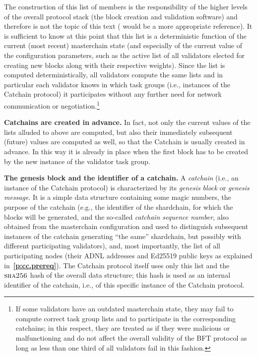 \documentclass[12pt,oneside]{article}
\def\makepoint#1{\medbreak\noindent{\bf #1.\ }}
\def\nxpoint{\refstepcounter{subsection}%
  \smallbreak\makepoint{\thesubsection}}
\def\nxsubpoint{\refstepcounter{subsubsection}%
  \smallbreak\makepoint{\thesubsubsection}}
\def\refpoint#1{{\rm\textbf{\ref{#1}}}}
\let\ptref=\refpoint
\def\emb#1{\textbf{#1.}}
\def\opsc#1{\operatorname{\textsc{#1}}}
\def\Sha{\opsc{sha256}}
\begin{document}
The construction of this list of members is the responsibility of the higher levels of the overall protocol stack (the block creation and validation software) and therefore is not the topic of this text (\cite{TBC} would be a more appropriate reference). It is sufficient to know at this point that this list is a deterministic function of the current (most recent) masterchain state (and especially of the current value of the configuration parameters, such as the active list of all validators elected for creating new blocks along with their respective weights). Since the list is computed deterministically, all validators compute the same lists and in particular each validator knows in which task groups (i.e., instances of the Catchain protocol) it participates without any further need for network communication or negotiation.\footnote{If some validators have an outdated masterchain state, they may fail to compute correct task group lists and to participate in the corresponding catchains; in this respect, they are treated as if they were malicious or malfunctioning and do not affect the overall validity of the BFT protocol as long as less than one third of all validators fail in this fashion.}

\nxsubpoint\emb{Catchains are created in advance}
In fact, not only the current values of the lists alluded to above are computed, but also their immediately subsequent (future) values are computed as well, so that the Catchain is usually created in advance. In this way it is already in place when the first block has to be created by the new instance of the validator task group.

\nxpoint\emb{The genesis block and the identifier of a catchain}\label{sp:cc.ident}
A {\em catchain\/} (i.e., an instance of the Catchain protocol) is characterized by its {\em genesis block} or {\em genesis message}. It is a simple data structure containing some magic numbers, the purpose of the catchain (e.g., the identifier of the shardchain, for which the blocks will be generated, and the so-called {\em catchain sequence number}, also obtained from the masterchain configuration and used to distinguish subsequent instances of the catchain generating ``the same'' shardchain, but possibly with different participating validators), and, most importantly, the list of all participating nodes (their ADNL addresses and Ed25519 public keys as explained in~\ptref{p:cc.prereq}). The Catchain protocol itself uses only this list and the $\Sha$ hash of the overall data structure; this hash is used as an internal identifier of the catchain, i.e., of this specific instance of the Catchain protocol.
\end{document}
